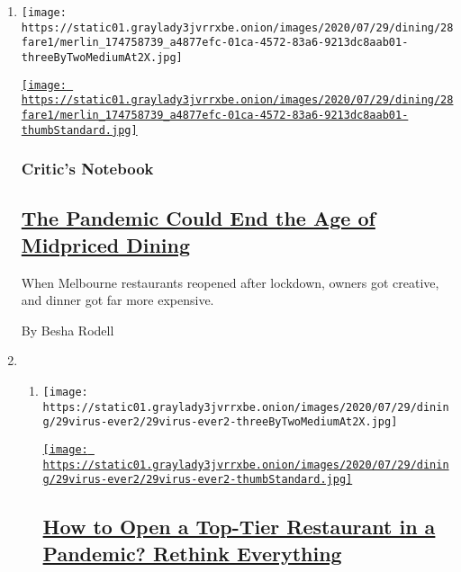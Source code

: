 \begin{enumerate}
\def\labelenumi{\arabic{enumi}.}
\item
  \texttt{[image: https://static01.graylady3jvrrxbe.onion/images/2020/07/29/dining/28fare1/merlin\_174758739\_a4877efc-01ca-4572-83a6-9213dc8aab01-threeByTwoMediumAt2X.jpg]}

  \href{/2020/07/28/dining/melbourne-restaurants-coronavirus.html}{\texttt{[image: https://static01.graylady3jvrrxbe.onion/images/2020/07/29/dining/28fare1/merlin\_174758739\_a4877efc-01ca-4572-83a6-9213dc8aab01-thumbStandard.jpg]}}

  \hypertarget{critics-notebook}{%
  \subsubsection{Critic's Notebook}\label{critics-notebook}}

  \hypertarget{the-pandemic-could-end-the-age-of-midpriced-dining}{%
  \subsection{\texorpdfstring{\href{/2020/07/28/dining/melbourne-restaurants-coronavirus.html}{The
  Pandemic Could End the Age of Midpriced
  Dining}}{The Pandemic Could End the Age of Midpriced Dining}}\label{the-pandemic-could-end-the-age-of-midpriced-dining}}

  When Melbourne restaurants reopened after lockdown, owners got
  creative, and dinner got far more expensive.

  By Besha Rodell
\item
  \begin{enumerate}
  \def\labelenumii{\arabic{enumii}.}
  \item
    \texttt{[image: https://static01.graylady3jvrrxbe.onion/images/2020/07/29/dining/29virus-ever2/29virus-ever2-threeByTwoMediumAt2X.jpg]}

    \href{/2020/07/28/dining/ever-chicago-restaurant-coronavirus.html}{\texttt{[image: https://static01.graylady3jvrrxbe.onion/images/2020/07/29/dining/29virus-ever2/29virus-ever2-thumbStandard.jpg]}}

    \hypertarget{how-to-open-a-top-tier-restaurant-in-a-pandemic-rethink-everything}{%
    \subsection{\texorpdfstring{\href{/2020/07/28/dining/ever-chicago-restaurant-coronavirus.html}{How
    to Open a Top-Tier Restaurant in a Pandemic? Rethink
    Everything}}{How to Open a Top-Tier Restaurant in a Pandemic? Rethink Everything}}\label{how-to-open-a-top-tier-restaurant-in-a-pandemic-rethink-everything}}


\end{enumerate}
\end{enumerate}
